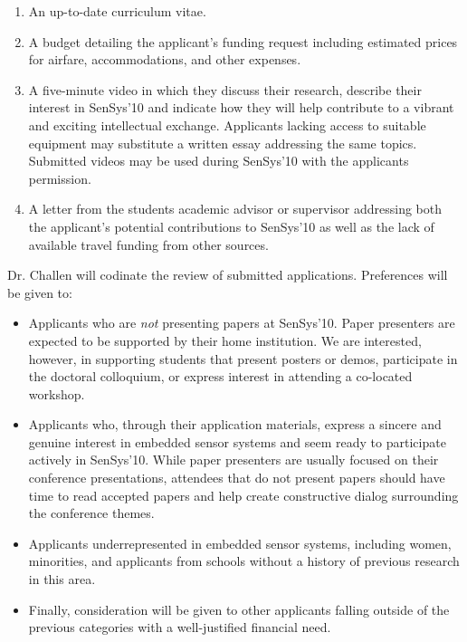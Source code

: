 \begin{enumerate}

\item An up-to-date curriculum vitae.

\item A budget detailing the applicant's funding request including estimated
prices for airfare, accommodations, and other expenses.

\item A five-minute video in which they discuss their research, describe
their interest in SenSys'10 and indicate how they will help contribute to a
vibrant and exciting intellectual exchange. Applicants lacking access to
suitable equipment may substitute a written essay addressing the same topics.
Submitted videos may be used during SenSys'10 with the applicants permission.

\item A letter from the students academic advisor or supervisor addressing
both the applicant's potential contributions to SenSys'10 as well as the lack
of available travel funding from other sources.

\end{enumerate}

Dr. Challen will codinate the review of submitted applications.
Preferences will be given to:

\begin{itemize}

\item Applicants who are \textit{not} presenting papers at SenSys'10. Paper
presenters are expected to be supported by their home institution. We are
interested, however, in supporting students that present posters or demos,
participate in the doctoral colloquium, or express interest in attending a
co-located workshop.

\item Applicants who, through their application materials, express a sincere
and genuine interest in embedded sensor systems and seem ready to participate
actively in SenSys'10. While paper presenters are usually focused on their
conference presentations, attendees that do not present papers should have
time to read accepted papers and help create constructive dialog surrounding
the conference themes.

\item Applicants underrepresented in embedded sensor systems, including
women, minorities, and applicants from schools without a history of previous
research in this area.

\item Finally, consideration will be given to other applicants falling
outside of the previous categories with a well-justified financial need.

\end{itemize}

